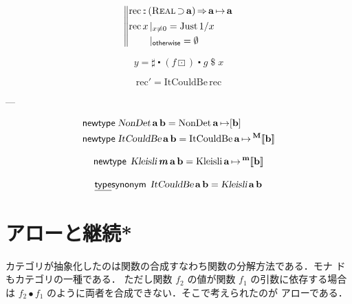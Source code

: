 \documentclass[a5paper,twoside,fleqn,draft]{jsbook}
\def\[{[\![}
\def\]{]\!]}
\newenvironment{leader}{\begingroup\gt}{\endgroup}
\newcommand{\mBrace}{\Vert}
\newcommand{\mKeyword}[1]{\mathsf{#1}}
\newcommand{\mKeywordUnderline}[1]{\text{\underline{\textsf{#1}}}}
\newcommand{\mNewTypeDeclKeyword}{\mKeyword{newtype}}
\newcommand{\mOtherwiseKeyword}{\mKeyword{otherwise}}
\newcommand{\mTypeSynonymDeclKeyword}{\mKeywordUnderline{type}\mKeyword{synonym}}
\DeclareMathOperator{\mNewTypeDecl}{\mNewTypeDeclKeyword}
\DeclareMathOperator{\mOtherwise}{\mOtherwiseKeyword}
\DeclareMathOperator{\mSuperClass}{\Rightarrow}
\DeclareMathOperator{\mSuperSet}{\supset}
\DeclareMathOperator{\mTypeSynonymDecl}{\mTypeSynonymDeclKeyword}
\newcommand{\mNothing}{\emptyset}
\DeclareMathOperator{\mApply}{\$}
\DeclareMathOperator{\mComp}{\centerdot}
\DeclareMathOperator{\mCompCat}{\bullet}
\DeclareMathOperator{\mIn}{{:\!:}}
\DeclareMathOperator{\mMapMaybe}{\boxdot}
\DeclareMathOperator{\mMapsTo}{\mapsto}
\newcommand{\mType}[1]{\mathbf{#1}} %
\newcommand{\mPolymorphicTypeParameter}[1]{\textbf{\textit{#1}}}
\newcommand{\mA}{\mType{a}}
\newcommand{\mB}{\mType{b}}
\newcommand{\mTypeAssemble}[2]{{}^\mType{#1}\[\mType{#2}\]}
\newcommand{\mMaybeType}[1]{\mTypeAssemble{M}{#1}}
\newcommand{\mTypeConstructor}[1]{\textsl{#1}}
\newcommand{\mValueConstructor}[1]{\mathrm{#1}}
\newcommand{\mValueWith}[2]{\mValueConstructor{#1}\,#2}
\newcommand{\mJustWith}[1]{\mValueWith{Just}{#1}}
\newcommand{\mTypeClass}[1]{\textsc{#1}} %
\newcommand{\mRealTypeClass}{\mTypeClass{Real}}
\newcommand{\mGuard}[1]{\mathop{\mid_{#1}}}
\begin{document}
\begin{equation}
  \left\mBrace
  \begin{aligned}
    &\mathrm{rec}
    \mIn{}(\mRealTypeClass\mSuperSet\mA)
    \mSuperClass\mA\mMapsTo\mA\\
    &
    \begin{aligned}
      \mathop{\mathrm{rec}}x&\mGuard{x\neq0}
      =\mJustWith{1/x}\\
      &\mGuard{\mOtherwise}
      =\mNothing
    \end{aligned}
  \end{aligned}
  \right.
\end{equation}

\begin{equation}
  y
  =\sharp\mComp(f\mMapMaybe)\mComp g\mApply x
\end{equation}

\begin{equation}
  \mathrm{rec}'
  =\mValueWith{ItCouldBe}{\mathrm{rec}}
\end{equation}

---

\begin{align}
  \mNewTypeDecl\;
  &\mTypeConstructor{NonDet}\,\mA\,\mB
  =\mValueWith{NonDet}{\mA\mMapsTo[\mB]}\\
  \mNewTypeDecl\;
  &\mTypeConstructor{ItCouldBe}\,\mA\,\mB
  =\mValueWith{ItCouldBe}{\mA\mMapsTo\mMaybeType{b}}
\end{align}

\begin{equation}
  \mNewTypeDecl\;
  \mTypeConstructor{Kleisli}\,\mPolymorphicTypeParameter{m}\,\mA\,\mB
  =\mValueWith{Kleisli}{\mA\mMapsTo\mTypeAssemble{m}{\mB}}
\end{equation}

\begin{equation}
  \mTypeSynonymDecl\;
  \mTypeConstructor{ItCouldBe}\,\mA\,\mB
  =\mTypeConstructor{Kleisli}\,\mA\,\mB
\end{equation}

\chapter{アローと継続*}

\begin{leader}
  カテゴリが抽象化したのは関数の合成すなわち関数の分解方法である．モナ
  ドもカテゴリの一種である．%
  ただし関数 $f_2$ の値が関数 $f_1$ の引数に依存する場合は
  $f_2\mCompCat f_1$ のように両者を合成できない．そこで考えられたのが
  アローである．
\end{leader}
\end{document}
